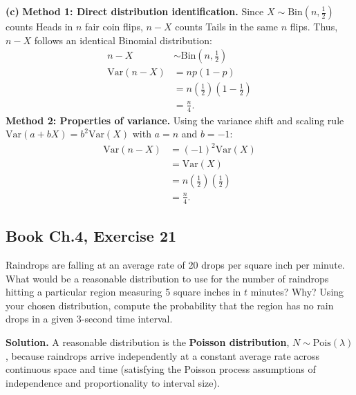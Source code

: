 \documentclass[11pt,a4paper]{article}
\begin{document}
\vspace{4pt}
\noindent \textbf{(c)} \textbf{Method 1: Direct distribution identification.} Since $X \sim \text{Bin}\left(n, \frac{1}{2}\right)$ counts Heads in $n$ fair coin flips, $n - X$ counts Tails in the same $n$ flips. Thus, $n - X$ follows an identical Binomial distribution:
\begin{align*}
n - X &\sim \text{Bin}\left(n, \frac{1}{2}\right) \\
\text{Var}(n - X) &= n p (1 - p) \\
&= n\left(\frac{1}{2}\right)\left(1 - \frac{1}{2}\right) \\
&= \frac{n}{4}.
\end{align*}
\textbf{Method 2: Properties of variance.} Using the variance shift and scaling rule $\text{Var}(a + bX) = b^2 \text{Var}(X)$ with $a = n$ and $b = -1$:
\begin{align*}
\text{Var}(n - X) &= (-1)^2 \text{Var}(X) \\
&= \text{Var}(X) \\
&= n\left(\frac{1}{2}\right)\left(\frac{1}{2}\right) \\
&= \frac{n}{4}.
\end{align*}

\vspace{10pt}
\subsection{Book Ch.4, Exercise 21}
\begin{tcolorbox}[title={Book Ch.4, Exercise 21}]
Raindrops are falling at an average rate of 20 drops per square inch per minute. What would be a reasonable distribution to use for the number of raindrops hitting a particular region measuring 5 square inches in $t$ minutes? Why? Using your chosen distribution, compute the probability that the region has no rain drops in a given 3-second time interval.
\end{tcolorbox}

\noindent \textbf{Solution.} A reasonable distribution is the \textbf{Poisson distribution}, $N \sim \text{Pois}(\lambda)$, because raindrops arrive independently at a constant average rate across continuous space and time (satisfying the Poisson process assumptions of independence and proportionality to interval size). 
\end{document}
